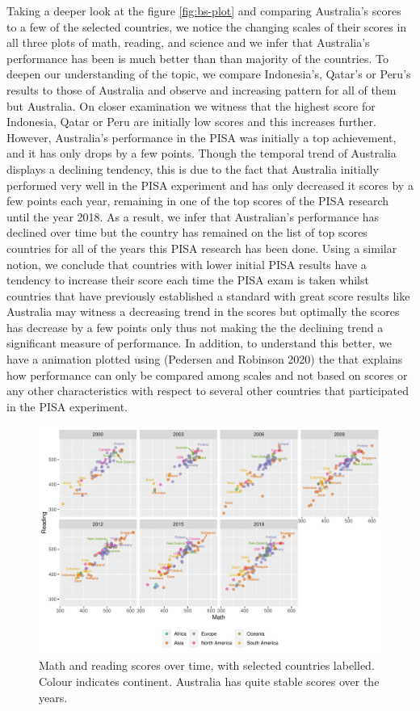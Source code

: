 Taking a deeper look at the figure \ref{fig:bs-plot} and comparing Australia's scores to a few of the selected countries, we notice the changing scales of their scores in all three plots of math, reading, and science and we infer that Australia's performance has been is much better than than majority of the countries. To deepen our understanding of the topic, we compare Indonesia's, Qatar's or Peru's results to those of Australia and observe and increasing pattern for all of them but Australia. On closer examination we witness that the highest score for Indonesia, Qatar or Peru are initially low scores and this increases further. However, Australia's performance in the PISA was initially a top achievement, and it has only drops by a few points. Though the temporal trend of Australia displays a declining tendency, this is due to the fact that Australia initially performed very well in the PISA experiment and has only decreased it scores by a few points each year, remaining in one of the top scores of the PISA research until the year 2018. As a result, we infer that Australian's performance has declined over time but the country has remained on the list of top scores countries for all of the years this PISA research has been done. Using a similar notion, we conclude that countries with lower initial PISA results have a tendency to increase their score each time the PISA exam is taken whilst countries that have previously established a standard with great score results like Australia may witness a decreasing trend in the scores but optimally the scores has decrease by a few points only thus not making the the declining trend a significant measure of performance. In addition, to understand this better, we have a animation plotted using  (Pedersen and Robinson 2020) the that explains how performance can only be compared among scales and not based on scores or any other characteristics with respect to several other countries that participated in the PISA experiment.

\begin{figure}
\includegraphics[width=1\linewidth]{learningtower_files/figure-latex/facet-time-1} \caption{Math and reading scores over time, with selected countries labelled. Colour indicates continent. Australia has quite stable scores over the years.}\label{fig:facet-time}
\end{figure}


